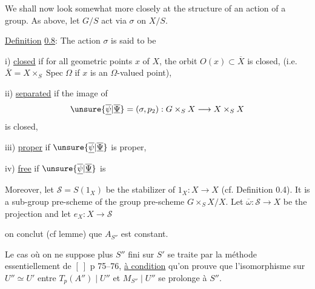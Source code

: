  We shall now look somewhat more closely at the structure of an action of a group. As above, let $G/S$ act via $\sigma$ on $X/S$.

\uline{Definition} \uline{0.8}: The action $\sigma$ is said to be

i) \uline{closed} if for all geometric points $x$ of $X$, the orbit $O(x)\subset\overline X$ is closed, (i.e. $\overline X=X\times_S\operatorname{Spec}\Omega$ if $x$ is an $\Omega$-valued point),

ii) \uline{separated} if the image of
\[
\unsure{\overline{\underline{\psi}}|\overline{\underline{\Psi}}}=(\sigma,p_2):G\times_S X\longrightarrow X\times_S X
\]
is closed,

iii) \uline{proper} if $\unsure{\overline{\underline{\psi}}|\overline{\underline{\Psi}}}$ is proper,

iv) \uline{free} if $\unsure{\overline{\underline{\psi}}|\overline{\underline{\Psi}}}$ is 

Moreover, let $\mathcal S=S(1_X)$ be the stabilizer of $1_X:X\to X$ (cf. Definition 0.4). It is a sub-group pre-scheme of the group pre-scheme $G\times_S X/X$. Let $\overline\omega:\mathcal S\longrightarrow X$ be the projection and let $e_X:X\longrightarrow\mathcal S$

on conclut (cf lemme) que $A_{S''}$ est constant.

Le cas où on ne suppose plus $S''$ fini sur $S'$ se traite par la méthode essentiellement de $[\ ]$ p 75--76, \uline{à condition} qu'on prouve que l'isomorphisme sur $U''\simeq U'$ entre $T_p(A'')\mid U''$ et $M_{S''}\mid U''$ se prolonge à $S''$.  

